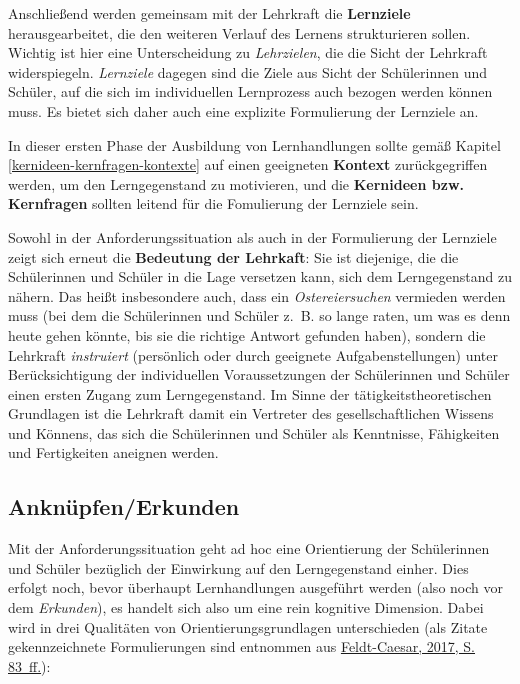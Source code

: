 \documentclass[
]{scrbook}
\theoremstyle{definition}
\theoremstyle{definition}
\theoremstyle{definition}
\theoremstyle{definition}
\theoremstyle{remark}
\begin{document}
Anschließend werden gemeinsam mit der Lehrkraft die \textbf{Lernziele} herausgearbeitet, die den weiteren Verlauf des Lernens strukturieren sollen. Wichtig ist hier eine Unterscheidung zu \emph{Lehrzielen}, die die Sicht der Lehrkraft widerspiegeln. \emph{Lernziele} dagegen sind die Ziele aus Sicht der Schülerinnen und Schüler, auf die sich im individuellen Lernprozess auch bezogen werden können muss. Es bietet sich daher auch eine explizite Formulierung der Lernziele an.

In dieser ersten Phase der Ausbildung von Lernhandlungen sollte gemäß Kapitel \ref{kernideen-kernfragen-kontexte} auf einen geeigneten \textbf{Kontext} zurückgegriffen werden, um den Lerngegenstand zu motivieren, und die \textbf{Kernideen bzw. Kernfragen} sollten leitend für die Fomulierung der Lernziele sein.

Sowohl in der Anforderungssituation als auch in der Formulierung der Lernziele zeigt sich erneut die \textbf{Bedeutung der Lehrkaft}: Sie ist diejenige, die die Schülerinnen und Schüler in die Lage versetzen kann, sich dem Lerngegenstand zu nähern. Das heißt insbesondere auch, dass ein \emph{Ostereiersuchen} vermieden werden muss (bei dem die Schülerinnen und Schüler z.~B. so lange raten, um was es denn heute gehen könnte, bis sie die richtige Antwort gefunden haben), sondern die Lehrkraft \emph{instruiert} (persönlich oder durch geeignete Aufgabenstellungen) unter Berücksichtigung der individuellen Voraussetzungen der Schülerinnen und Schüler einen ersten Zugang zum Lerngegenstand. Im Sinne der tätigkeitstheoretischen Grundlagen ist die Lehrkraft damit ein Vertreter des gesellschaftlichen Wissens und Könnens, das sich die Schülerinnen und Schüler als Kenntnisse, Fähigkeiten und Fertigkeiten aneignen werden.

\hypertarget{anknuepfen-erkunden}{%
\subsection{Anknüpfen/Erkunden}\label{anknuepfen-erkunden}}

Mit der Anforderungssituation geht ad hoc eine Orientierung der Schülerinnen und Schüler bezüglich der Einwirkung auf den Lerngegenstand einher. Dies erfolgt noch, bevor überhaupt Lernhandlungen ausgeführt werden (also noch vor dem \emph{Erkunden}), es handelt sich also um eine rein kognitive Dimension. Dabei wird in drei Qualitäten von Orientierungsgrundlagen unterschieden (als Zitate gekennzeichnete Formulierungen sind entnommen aus \protect\hyperlink{ref-Feldt-Caesar2017}{Feldt-Caesar, 2017, S. 83~ff.}):
\end{document}

